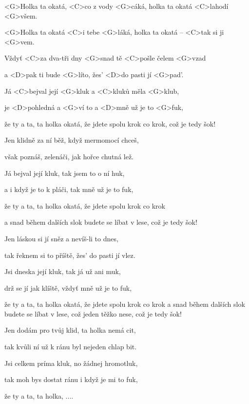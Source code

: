 

\zr
<G>Holka ta okatá, <C>co z vody <G>cáká,
holka ta okatá <C>lahodí <G>všem.

<G>Holka ta okatá <C>i tebe <G>láká,
holka ta okatá -- <C>tak si ji <G>vem.
\kr

\zs
Vždyť <C>za dva-tři dny <G>snad tě <C>pošle čelem <G>vzad

a <D>pak ti bude <G>líto, žes' <D>do pasti jí <G>pad'.

Já <C>bejval její <G>kluk a <C>kluků měla <G>klub,

je <D>pohledná a <G>ví to a <D>mně už je to <G>fuk,

že ty a ta, ta holka okatá, že jdete spolu krok co krok,
což je tedy šok!
\ks

\zr \kr

\zs
Jen klidně za ní běž, když mermomocí chceš,

však poznáš, zelenáči, jak hořce chutná lež.

Já bejval její kluk, tak jsem to o ní huk,

a i když je to k pláči, tak mně už je to fuk,

že ty a ta, ta holka okatá, že jdete spolu krok co krok

a snad během dalších slok budete se líbat v lese,
což je tedy šok!
\ks

\zr \kr

\zs
Jen láskou si jí sněz a nevíš-li to dnes,

tak řeknem si to příště, žes' do pasti jí vlez.

Jsi dneska její kluk, tak já už ani muk,

drž se jí jak klíště, vždyť mně už je to fuk,

že ty a ta, ta holka okatá, že jdete spolu krok co krok
a snad během dalších slok
budete se líbat v lese, což jeden těžko nese, což je tedy šok!
\ks

\zr \kr

\zs
Jen dodám pro tvůj klid, ta holka nemá cit,

tak kvůli ní už k ránu byl nejeden chlap bit.

Jsi celkem príma kluk, no žádnej hromotluk,

tak moh bys dostat ránu i když je mi to fuk,

že ty a ta, ta holka, ....
\ks

\kp
